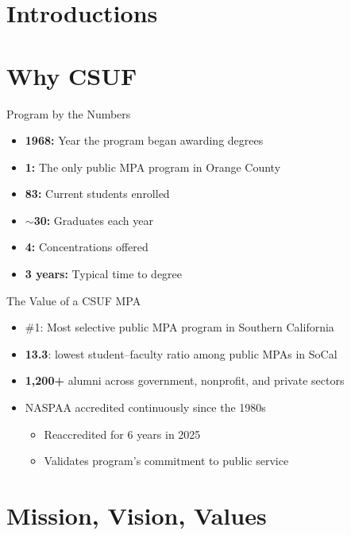 \documentclass[10pt]{beamer}
\begin{document}
\section{\textcolor{titanorange}{Introductions}}

\section{\textcolor{titanorange}{Why CSUF}}
\begin{frame}{Program by the Numbers}
\begin{Large}
\begin{itemize}
  \item \textbf{1968:} Year the program began awarding degrees
  \item \textbf{1:} The only public MPA program in Orange County
  \item \textbf{83:} Current students enrolled
  \item \textbf{\(\sim\)30:} Graduates each year
  \item \textbf{4:} Concentrations offered
  \item \textbf{3 years:} Typical time to degree
\end{itemize}
\end{Large}
\end{frame}

\begin{frame}{The Value of a CSUF MPA}
\begin{Large}
\begin{itemize}
  \item \#1: Most selective public MPA program in Southern California
  \item \textbf{13.3}: lowest student--faculty ratio among public MPAs in SoCal
  \item \textbf{1,200+} alumni across government, nonprofit, and private sectors
  \item NASPAA accredited continuously since the 1980s
    \begin{itemize}
      \item Reaccredited for 6 years in 2025
      \item Validates program's commitment to public service
    \end{itemize}
\end{itemize}
\end{Large}
\end{frame}


\section{\textcolor{titanorange}{Mission, Vision, Values}}
\end{document}
